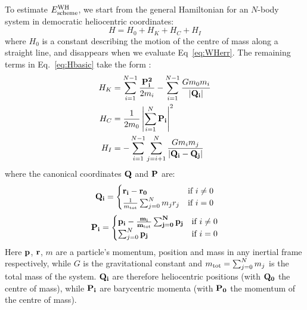 To estimate  $E_{\rm scheme}^{\rm WH}$, we start from the general Hamiltonian for an $N$-body system in democratic heliocentric coordinates:
\begin{equation*}
H = H_0 + H_K + H_C + H_I
\label{eq:Hbasic}
\end{equation*}
where $H_0$ is a constant describing the motion of the centre of mass along a straight line, and disappears when we evaluate Eq~\ref{eq:WHerr}. 
The remaining terms in Eq.~\ref{eq:Hbasic} take the form \citep{Duncan1998}:
\begin{align}
H_K &= \sum_{i=1}^{N-1} \frac{\bf{P}_i^2}{2m_i} - \sum_{i=1}^{N-1} \frac{Gm_0m_i}{|\bf{Q_i}|} \label{eq:H_K}\\
H_C &= \frac{1}{2m_0} \left|\sum_{i=1}^{N} \bf{P}_i \right|^2 \label{eq:H_C}\\
H_I &= -\sum_{i=1}^{N-1}\sum_{j=i+1}^{N} \frac{Gm_im_j}{|\bf{Q}_i - \bf{Q}_j|}\label{eq:H_I}
\end{align}
where the canonical coordinates $\bf{Q}$ and $\bf{P}$ are:
\begin{equation}
\bf{Q}_i = \begin{cases}
\bf{r}_i - \bf{r}_0 & \text{if } i \ne 0\\
\frac{1}{m_{\rm tot}}\sum_{j=0}^{N}m_jr_j & \text{if } i = 0\\
\end{cases}
\end{equation}
\begin{equation}
\bf{P}_i = \begin{cases}
\bf{p}_i - \frac{m_i}{m_{\rm tot}} \sum_{j=0}^{N} \bf{p}_j & \text{if } i \ne 0\\
\sum_{j=0}^{N} \bf{p}_j & \text{if } i = 0\\
\end{cases}
\end{equation}
Here $\bf{p}$, $\bf{r}$, $m$ are a particle's momentum, position and mass in any inertial frame respectively, while $G$ is the gravitational constant and $m_{\rm tot} =  \sum_{j=0}^{N} m_j$ is the total mass of the system.
$\bf{Q}_i$ are therefore heliocentric positions (with $\bf{Q}_0$ the centre of mass), while $\bf{P}_i$ are barycentric momenta (with $\bf{P}_0$ the momentum of the centre of mass).

